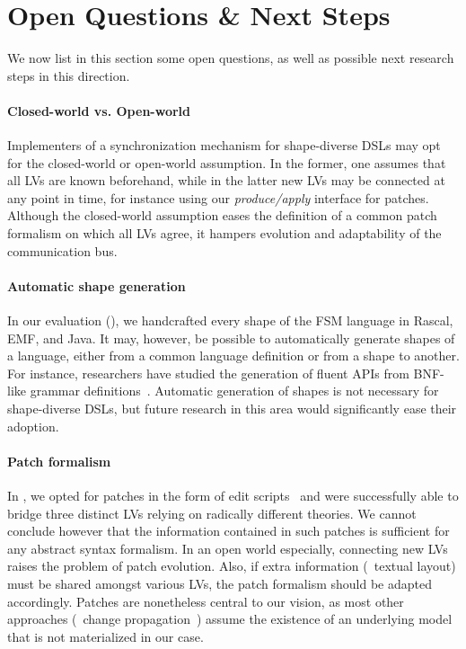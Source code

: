 \section{Open Questions \& Next Steps}
\label{sec:discussion}
We now list in this section some open questions, as well as possible next research steps in this direction.

\paragraph{Closed-world vs. Open-world}
Implementers of a synchronization mechanism for shape-diverse DSLs may opt for the closed-world or open-world assumption.
In the former, one assumes that all LVs are known beforehand, while in the latter new LVs may be connected at any point in time, for instance using our \emph{produce/apply} interface for patches.
Although the closed-world assumption eases the definition of a common patch formalism on which all LVs agree, it hampers evolution and adaptability of the communication bus.

\paragraph{Automatic shape generation}
In our evaluation (), we handcrafted every shape of the FSM language in Rascal, EMF, and Java.
It may, however, be possible to automatically generate shapes of a language, either from a common language definition or from a shape to another.
For instance, researchers have studied the generation of fluent APIs from BNF-like grammar definitions~\cite{nakamaru2017silverchain}.
Automatic generation of shapes is not necessary for shape-diverse DSLs, but future research in this area would significantly ease their adoption.

\paragraph{Patch formalism}
In \prism, we opted for patches in the form of edit scripts~\cite{rozen2017towards} and were successfully able to bridge three distinct LVs relying on radically different theories.
We cannot conclude however that the information contained in such patches is sufficient for any abstract syntax formalism.
In an open world especially, connecting new LVs raises the problem of patch evolution.
Also, if extra information (\eg~textual layout) must be shared amongst various LVs, the patch formalism should be adapted accordingly. %
Patches are nonetheless central to our vision, as most other approaches (\eg~change propagation~\cite{DBLP:conf/etaps/SemerathDHV16}) assume the existence of an underlying model that is not materialized in our case.

